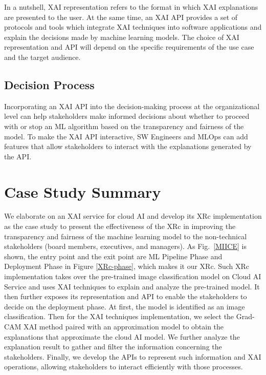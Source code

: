 \documentclass[conference]{IEEEtran}
\begin{document}
In a nutshell, XAI representation refers to the format in which XAI explanations are presented to the user. At the same time, an XAI API provides a set of protocols and tools which integrate XAI techniques into software applications and explain the decisions made by machine learning models. The choice of XAI representation and API will depend on the specific requirements of the use case and the target audience.

\subsection{Decision Process}
Incorporating an XAI API into the decision-making process at the organizational level can help stakeholders make informed decisions about whether to proceed with or stop an ML algorithm based on the transparency and fairness of the model. To make the XAI API interactive, SW Engineers and MLOps can add features that allow stakeholders to interact with the explanations generated by the API.

\section{Case Study Summary}

We elaborate on an XAI service for cloud AI and develop its XRc implementation as the case study to present the effectiveness of the XRc in improving the transparency and fairness of the machine learning model to the non-technical stakeholders (board members, executives, and managers). 
As Fig.~\ref{MIICE} is shown, the entry point and the exit point are ML Pipeline Phase and Deployment Phase in Figure \ref{XRc-phase}, which makes it our XRc. Such XRc implementation takes over the pre-trained image classification model on Cloud AI Service and uses XAI techniques to explain and analyze the pre-trained model. It then further exposes its representation and API to enable the stakeholders to decide on the deployment phase. At first, the model is identified as an image classification. Then for the XAI techniques implementation, we select the Grad-CAM XAI method paired with an approximation model to obtain the explanations that approximate the cloud AI model. We further analyze the explanation result to gather and filter the information concerning the stakeholders. Finally, we develop the APIs to represent such information and XAI operations, allowing stakeholders to interact efficiently with those processes.
\end{document}
